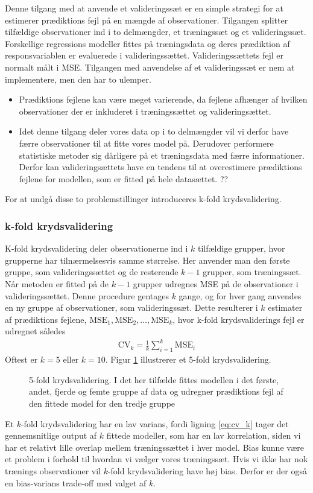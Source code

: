 Denne tilgang med at anvende et valideringssæt er en simple strategi for at estimerer prædiktions fejl på en mængde af observationer. 
Tilgangen splitter tilfældige observationer ind  i to delmængder, et træningssæt og et valideringssæt. 
Forskellige regressions modeller fittes på træningsdata og deres prædiktion af responsvariablen er evaluerede i valideringssættet. 
Valideringssættets fejl er normalt målt i MSE. 
Tilgangen med anvendelse af et valideringssæt er nem at implementere, men den har to ulemper. 
\begin{itemize}
\item Prædiktions fejlene kan være meget varierende, da fejlene afhænger af hvilken observationer der er inkluderet i træningssættet og valideringsættet. 
\item Idet denne tilgang deler vores data op i to delmængder vil vi derfor have færre observationer til at fitte vores model på. Derudover performere statistiske metoder sig dårligere på et træningsdata med færre informationer. Derfor kan valideringsættets have en tendens til at overestimere prædiktions fejlene for modellen, som er fitted på hele datasættet. ??
\end{itemize}
For at undgå disse to problemstillinger introduceres k-fold krydsvalidering. 

\subsubsection{k-fold krydsvalidering}
K-fold krydsvalidering deler observationerne ind i $k$ tilfældige grupper, hvor grupperne har  tilnærmelsesvis samme størrelse. 
Her anvender man den første gruppe, som valideringssættet og de resterende $k-1$ grupper, som træningssæt. 
Når metoden er fitted på de $k-1$ grupper udregnes MSE på de observationer i valideringssættet. 
Denne procedure gentages $k$ gange, og for hver gang anvendes en ny gruppe af observationer, som valideringssæt. 
Dette resulterer i $k$ estimater af prædiktions fejlene, $\text{MSE}_1, \text{MSE}_2, \dots , \text{MSE}_k $, hvor k-fold krydsvaliderings fejl er udregnet således
\begin{align}
\text{CV}_k = \frac{1}{k} \sum_{i=1}^k \text{MSE}_i \label{eq:cv_k}
\end{align}
Oftest er $k=5$ eller $k = 10$. 
Figur \ref{fig:cv_teori} illustrerer et 5-fold krydsvalidering. 
%
\begin{figure}
\center
\scalebox{0.7}{}
\caption{5-fold krydsvalidering. I det her tilfælde fittes modellen i det første, andet, fjerde og femte gruppe af data og udregner prædiktions fejl af den fittede model for den tredje gruppe} \label{fig:cv_teori}
\end{figure} 
%
Et $k$-fold krydsvalidering har en lav varians, fordi ligning \eqref{eq:cv_k} tager det gennemsnitlige output af $k$ fittede modeller, som har en lav korrelation, siden vi har et relativt lille overlap mellem træningssættet i hver model. 
Bias kunne være et problem i forhold til hvordan vi vælger vores træningssæt. Hvis vi ikke har nok trænings observationer vil $k$-fold krydsvalidering have høj bias. Derfor er der også en bias-varians trade-off med valget af $k$. 


